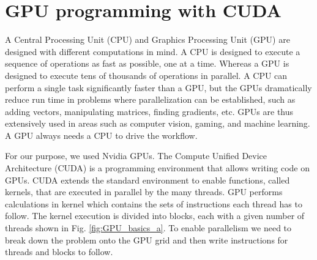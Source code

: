 \section{GPU programming with CUDA {\cpp} }%

A Central Processing Unit (CPU) and Graphics Processing Unit (GPU) are designed with different computations in mind. A CPU is designed to execute a sequence of operations as fast as possible, one at a time. Whereas a GPU is designed to execute tens of thousands of operations in parallel. A CPU can perform a single task significantly faster than a GPU, but the GPUs dramatically reduce run time in problems where parallelization can be established, such as adding vectors, manipulating matrices, finding gradients, etc. GPUs are thus extensively used in areas such as computer vision, gaming, and machine learning. A GPU always needs a CPU to drive the workflow. 

For our purpose, we used Nvidia GPUs. The Compute Unified Device Architecture (CUDA) is a programming environment that allows writing {\cpp} code on GPUs. CUDA extends the standard {\cpp} environment to enable functions, called kernels, that are executed in parallel by the many threads. GPU performs calculations in kernel which contains the sets of instructions each thread has to follow. The kernel execution is divided into blocks, each with a given number of threads shown in Fig. \ref{fig:GPU_basics_a}. To enable parallelism we need to break down the problem onto the GPU grid and then write instructions for threads and blocks to follow.

